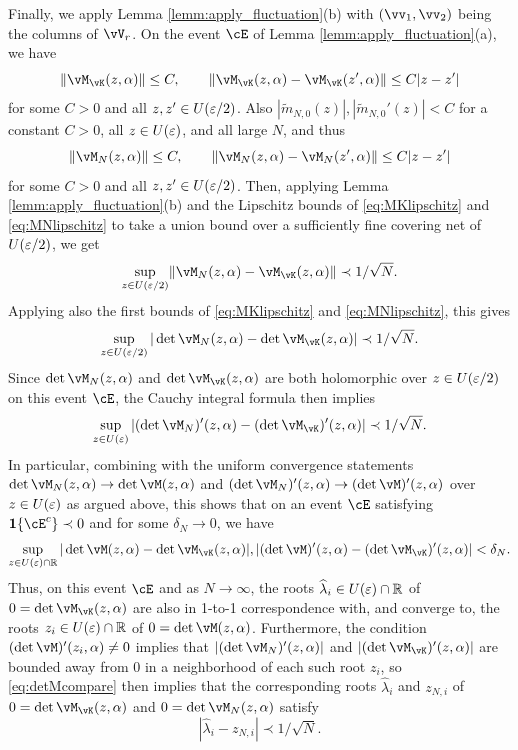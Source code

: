 \begin{proof-of-theorem}
Finally, we apply Lemma \ref{lemm:apply_fluctuation}(b) with $(\vv_1,\vv_2)$
being the columns of $\vV_r$. On the event $\cE$ of
Lemma \ref{lemm:apply_fluctuation}(a), we have
\begin{equation}\label{eq:MKlipschitz}
\norm{\vM_{\vK}(z,\alpha)} \leq C, \qquad
	\norm{\vM_{\vK}(z,\alpha)-\vM_{\vK}(z',\alpha)} \leq C|z-z'|
\end{equation}
for some $C>0$ and all $z,z' \in U(\varepsilon/2)$.
Also $|\tilde{m}_{N,0}(z)|,|\tilde{m}_{N,0}'(z)|<C$
for a constant $C>0$, all $z \in U(\varepsilon)$, and all large $N$, and thus
\begin{equation}\label{eq:MNlipschitz}
\norm{\vM_N(z,\alpha)} \leq C, \qquad
\norm{\vM_N(z,\alpha)-\vM_N(z',\alpha)} \leq C|z-z'|
\end{equation}
for some $C>0$ and all $z,z' \in U(\varepsilon/2)$.
Then, applying Lemma \ref{lemm:apply_fluctuation}(b) and the Lipschitz
bounds of \eqref{eq:MKlipschitz} and \eqref{eq:MNlipschitz} to take
a union bound over a sufficiently fine covering net of $U(\varepsilon/2)$, we get
\begin{equation}\label{eq:MKuniformapprox}
\sup_{z \in U(\eps/2)} \norm{\vM_N(z,\alpha)-\vM_{\vK}(z,\alpha)} \prec 1/\sqrt{N}.
\end{equation}
Applying also the first bounds of \eqref{eq:MKlipschitz}
and \eqref{eq:MNlipschitz}, this gives
\begin{equation}\label{eq:detMcompare}
\sup_{z \in U(\eps/2)} |\det \vM_N(z,\alpha)-\det \vM_{\vK}(z,\alpha)|
\prec 1/\sqrt{N}.
\end{equation}
Since $\det \vM_N(z,\alpha)$ and $\det \vM_{\vK}(z,\alpha)$ are both holomorphic
over $z \in U(\varepsilon/2)$ on this event $\cE$,
the Cauchy integral formula then implies
\[\sup_{z \in U(\eps)} |(\det \vM_N)'(z,\alpha)-(\det \vM_{\vK})'(z,\alpha)|
\prec 1/\sqrt{N}.\]
In particular, combining with the uniform convergence statements
$\det \vM_N(z,\alpha) \to \det \vM(z,\alpha)$ and $(\det \vM_N)'(z,\alpha) \to
(\det \vM)'(z,\alpha)$ over $z \in U(\varepsilon)$ as argued above,
this shows that on an event $\cE$ satisfying $\bI\{\cE^c\} \prec
0$ and for some $\delta_N \to 0$, we have
\[\sup_{z \in U(\eps) \cap \R} |\det \vM(z,\alpha)-\det \vM_{\vK}(z,\alpha)|,
|(\det \vM)'(z,\alpha)-(\det \vM_{\vK})'(z,\alpha)|<\delta_N.\]
Thus, on this event $\cE$ and as $N \to \infty$, the roots $\widehat \lambda_i
\in U(\varepsilon) \cap \mathbb{R}$ of $0=\det
\vM_{\vK}(z,\alpha)$ are also in 1-to-1 correspondence with, and converge to,
the roots $z_i \in U(\varepsilon) \cap \mathbb{R}$ of $0=\det \vM(z,\alpha)$.
Furthermore, the condition $(\det \vM)'(z_i,\alpha) \neq 0$ implies that
$|(\det \vM_N)'(z,\alpha)|$ and $|(\det \vM_{\vK})'(z,\alpha)|$ are bounded away
from 0 in a neighborhood of each such root $z_i$, so \eqref{eq:detMcompare}
then implies that the corresponding roots $\widehat \lambda_i$ and $z_{N,i}$ of
$0=\det \vM_{\vK}(z,\alpha)$ and $0=\det \vM_N(z,\alpha)$ satisfy
\[|\widehat \lambda_i-z_{N,i}| \prec 1/\sqrt{N}.\]


\end{proof-of-theorem}
